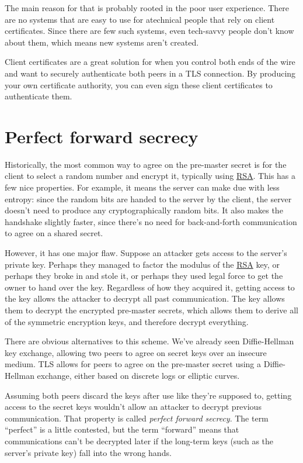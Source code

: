 \documentclass[11pt,ebook,table,dvipsnames]{memoir}
\begin{document}
The main reason for that is probably rooted in the poor user
experience. There are no systems that are easy to use for atechnical
people that rely on client certificates. Since there are few such
systems, even tech-savvy people don't know about them, which means
new systems aren't created.

Client certificates are a great solution for when you control both
ends of the wire and want to securely authenticate both peers in a
TLS connection. By producing your own certificate authority, you can
even sign these client certificates to authenticate them.
\section{Perfect forward secrecy}
\label{sec-3-1-6}

Historically, the most common way to agree on the pre-master secret is
for the client to select a random number and encrypt it, typically
using \hyperref[RSA]{RSA}. This has a few nice properties. For example, it means the
server can make due with less entropy: since the random bits are
handed to the server by the client, the server doesn't need to produce
any cryptographically random bits. It also makes the handshake
slightly faster, since there's no need for back-and-forth
communication to agree on a shared secret.

However, it has one major flaw. Suppose an attacker gets access to the
server's private key. Perhaps they managed to factor the modulus of
the \hyperref[RSA]{RSA} key, or perhaps they broke in and stole it, or perhaps they
used legal force to get the owner to hand over the key. Regardless of
how they acquired it, getting access to the key allows the attacker to
decrypt all past communication. The key allows them to decrypt the
encrypted pre-master secrets, which allows them to derive all of the
symmetric encryption keys, and therefore decrypt everything.

There are obvious alternatives to this scheme. We've already seen
Diffie-Hellman key exchange, allowing two peers to agree on secret
keys over an insecure medium. TLS allows for peers to agree on the
pre-master secret using a Diffie-Hellman exchange, either based on
discrete logs or elliptic curves.

Assuming both peers discard the keys after use like they're supposed
to, getting access to the secret keys wouldn't allow an attacker to
decrypt previous communication. That property is called \emph{perfect
forward secrecy}. The term \enquote{perfect} is a little contested, but the
term \enquote{forward} means that communications can't be decrypted later if
the long-term keys (such as the server's private key) fall into the
wrong hands.
\end{document}
